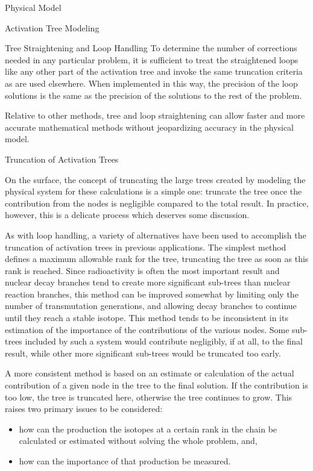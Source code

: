 \begin{chapter}{Physical Model\label{chap:physical}}
\begin{section}{Activation Tree Modeling\label{sec:physical.chains}}
\begin{subsection}{Tree Straightening and Loop Handling\label{sec:physical.chains.loops}}
    To determine the number of corrections needed in any particular
    problem, it is sufficient to treat the straightened loops like any
    other part of the activation tree and invoke the same truncation
    criteria as are used elsewhere.  When implemented in this way, the
    precision of the loop solutions is the same as the precision of
    the solutions to the rest of the problem.
    
    Relative to other methods, tree and loop straightening can allow
    faster and more accurate mathematical methods without jeopardizing
    accuracy in the physical model.

  \end{subsection}

  \begin{subsection}{Truncation of Activation Trees\label{sec:physical.chains.trunc}}
    
    On the surface, the concept of truncating the large trees created
    by modeling the physical system for these calculations is a simple
    one: truncate the tree once the contribution from the nodes is
    negligible compared to the total result.  In practice, however,
    this is a delicate process which deserves some discussion.
    
    As with loop handling, a variety of alternatives have been used to
    accomplish the truncation of activation trees in previous
    applications.  The simplest method defines a maximum allowable
    rank for the tree, truncating the tree as soon as this rank is
    reached.  Since radioactivity is often the most important result
    and nuclear decay branches tend to create more significant
    sub-trees than nuclear reaction branches, this method can be
    improved somewhat by limiting only the number of transmutation
    generations, and allowing decay branches to continue until they
    reach a stable isotope\cite{RACC}.  This method tends to be
    inconsistent in its estimation of the importance of the
    contributions of the various nodes.  Some sub-trees included by
    such a system would contribute negligibly, if at all, to the final
    result, while other more significant sub-trees would be truncated
    too early.
    
    A more consistent method is based on an estimate or calculation of
    the actual contribution of a given node in the tree to the final
    solution.  If the contribution is too low, the tree is truncated
    here, otherwise the tree continues to grow.  This raises two
    primary issues to be considered:
    \begin{itemize}
    \item how can the production the isotopes at a certain rank in the
      chain be calculated or estimated without solving the whole
      problem, and,
    \item how can the importance of that production be measured.
    \end{itemize}
    

\end{subsection}
\end{section}
\end{chapter}
